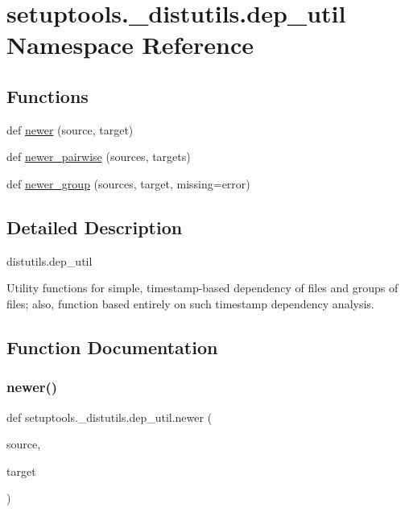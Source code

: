 \hypertarget{namespacesetuptools_1_1__distutils_1_1dep__util}{}\section{setuptools.\+\_\+distutils.\+dep\+\_\+util Namespace Reference}
\label{namespacesetuptools_1_1__distutils_1_1dep__util}
\subsection*{Functions}
\begin{DoxyCompactItemize}
\item 
def \hyperlink{namespacesetuptools_1_1__distutils_1_1dep__util_a1a74a87b034b2430cec5fc9b6dfac5ce}{newer} (source, target)
\item 
def \hyperlink{namespacesetuptools_1_1__distutils_1_1dep__util_a56795f3ddcbca1971c4e426bfc80c4f7}{newer\+\_\+pairwise} (sources, targets)
\item 
def \hyperlink{namespacesetuptools_1_1__distutils_1_1dep__util_aabcdb616fc98451fe469ae055c1f8f11}{newer\+\_\+group} (sources, target, missing=\textquotesingle{}error\textquotesingle{})
\end{DoxyCompactItemize}


\subsection{Detailed Description}
\begin{DoxyVerb}distutils.dep_util

Utility functions for simple, timestamp-based dependency of files
and groups of files; also, function based entirely on such
timestamp dependency analysis.\end{DoxyVerb}
 

\subsection{Function Documentation}
\mbox{\label{namespacesetuptools_1_1__distutils_1_1dep__util_a1a74a87b034b2430cec5fc9b6dfac5ce}} 
\subsubsection{\texorpdfstring{newer()}{newer()}}
{\footnotesize\ttfamily def setuptools.\+\_\+distutils.\+dep\+\_\+util.\+newer (\begin{DoxyParamCaption}\item[{}]{source,  }\item[{}]{target }\end{DoxyParamCaption})}

